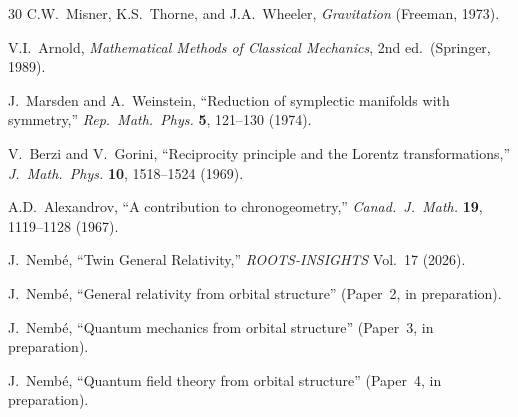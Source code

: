 \documentclass[12pt]{article}
\theoremstyle{plain}
\theoremstyle{definition}
\theoremstyle{remark}
\begin{document}
\begin{thebibliography}{30}
 C.W.~Misner, K.S.~Thorne, and J.A.~Wheeler, \emph{Gravitation} (Freeman, 1973).

 V.I.~Arnold, \emph{Mathematical Methods of Classical Mechanics}, 2nd ed.\ (Springer, 1989).

 J.~Marsden and A.~Weinstein, ``Reduction of symplectic manifolds with symmetry,'' \emph{Rep.\ Math.\ Phys.} \textbf{5}, 121--130 (1974).

 V.~Berzi and V.~Gorini, ``Reciprocity principle and the Lorentz transformations,'' \emph{J.\ Math.\ Phys.} \textbf{10}, 1518--1524 (1969).

 A.D.~Alexandrov, ``A contribution to chronogeometry,'' \emph{Canad.\ J.\ Math.} \textbf{19}, 1119--1128 (1967).

 J.~Nemb\'e, ``Twin General Relativity,'' \emph{ROOTS-INSIGHTS} Vol.~17 (2026).

 J.~Nemb\'e, ``General relativity from orbital structure'' (Paper~2, in preparation).

 J.~Nemb\'e, ``Quantum mechanics from orbital structure'' (Paper~3, in preparation).

 J.~Nemb\'e, ``Quantum field theory from orbital structure'' (Paper~4, in preparation).

\end{thebibliography}
\end{document}
